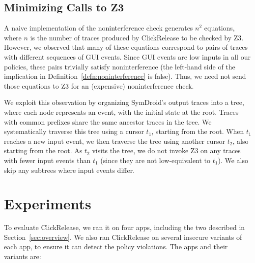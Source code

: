 \documentclass{llncs}
\newcommand{\toolname}{ClickRelease\xspace}
\begin{document}
\subsection{Minimizing Calls to Z3}
\label{sec:z3-tree}

A naive implementation of the noninterference check generates $n^2$
equations, where $n$ is the number of traces produced by \toolname{}
to be checked by Z3. However, we observed that many of these equations
correspond to pairs of traces with different sequences of GUI
events. Since GUI events are low inputs in all our policies, these
pairs trivially satisfy noninterference (the left-hand side of the
implication in Definition~\ref{defn:noninterference} is false).
 Thus, we need not send those
equations to Z3 for an (expensive) noninterference check.

We exploit this observation by organizing SymDroid's output traces
into a tree, where each node represents an event, with
the initial state at the root. Traces with common prefixes share the
same ancestor traces in the tree. We systematically traverse this tree
using a cursor $t_1$, starting from the root. When $t_1$ reaches a new
input event, we then traverse the tree using another cursor $t_2$,
also starting from the root. As $t_2$ visits the tree, we do not
invoke Z3 on any traces with fewer input events than $t_1$ (since they
are not low-equivalent to $t_1$). We also skip any subtrees where 
input events differ.

\section{Experiments}
\label{sec:experiments}

To evaluate \toolname{}, we ran it on four apps, including the two
described in Section~\ref{sec:overview}. We also ran \toolname{} on
several insecure variants of each app, to ensure it can detect the
policy violations. The apps and their variants
are:
\end{document}
